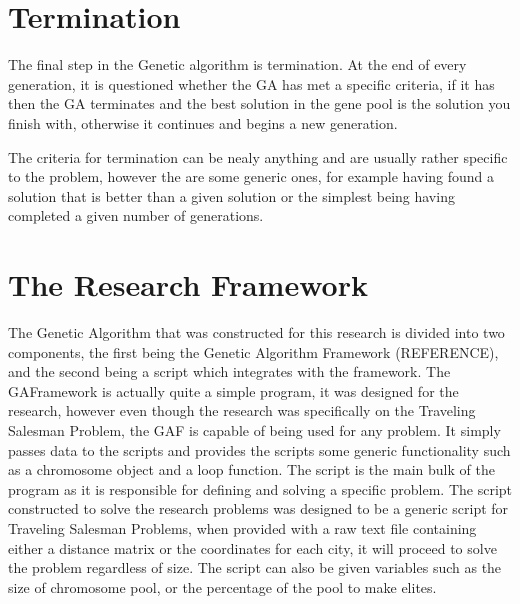 \section{Termination}
\par
The final step in the Genetic algorithm is termination. At the end of every generation, it is questioned whether the GA has met a specific criteria, if it has then the GA terminates and the best solution in the gene pool is the solution you finish with, otherwise it continues and begins a new generation.
\par
The criteria for termination can be nealy anything and are usually rather specific to the problem, however the are some generic ones, for example having found a solution that is better than a given solution or the simplest being having completed a given number of generations.
\section{The Research Framework}
\par
The Genetic Algorithm that was constructed for this research is divided into two components, the first being the Genetic Algorithm Framework (REFERENCE), and the second being a script which integrates with the framework.
The GAFramework is actually quite a simple program, it was designed for the research, however even though the research was specifically on the Traveling Salesman Problem, the GAF is capable of being used for any problem. It simply passes data to the scripts and provides the scripts some generic functionality such as a chromosome object and a loop function.
The script is the main bulk of the program as it is responsible for defining and solving a specific problem. The script constructed to solve the research problems was designed to be a generic script for Traveling Salesman Problems, when provided with a raw text file containing either a distance matrix or the coordinates for each city, it will proceed to solve the problem regardless of size. The script can also be given variables such as the size of chromosome pool, or the percentage of the pool to make elites. 

